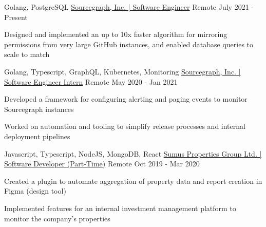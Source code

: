 

\begin{cventries}

  \cventry
    {Golang, PostgreSQL} %
    {\href{https://bobheadxi.dev/experience/sourcegraph}{Sourcegraph, Inc. | Software Engineer}} %
    {Remote} %
    {July 2021 - Present} %
    {
        \begin{cvitems}
          \item {Designed and implemented an up to 10x faster algorithm for mirroring permissions from very large GitHub instances, and enabled database queries to scale to match}
        \end{cvitems}
    }

  \cventry
    {Golang, Typescript, GraphQL, Kubernetes, Monitoring} %
    {\href{https://bobheadxi.dev/experience/sourcegraph-intern}{Sourcegraph, Inc. | Software Engineer Intern}} %
    {Remote} %
    {May 2020 - Jan 2021} %
    {
      \begin{cvitems} %
        \item {Developed a framework for configuring alerting and paging events to monitor Sourcegraph instances}
        \item {Worked on automation and tooling to simplify release processes and internal deployment pipelines}
      \end{cvitems}
    }

  \cventry
    {Javascript, Typescript, NodeJS, MongoDB, React} %
    {\href{https://bobheadxi.dev/experience/sumus}{Sumus Properties Group Ltd. | Software Developer (Part-Time)}} %
    {Remote} %
    {Oct 2019 - Mar 2020} %
    {
      \begin{cvitems} %
        \item {Created a plugin to automate aggregation of property data and report creation in Figma (design tool)}
        \item {Implemented features for an internal investment management platform to monitor the company's properties}
      \end{cvitems}
    }


\end{cventries}

